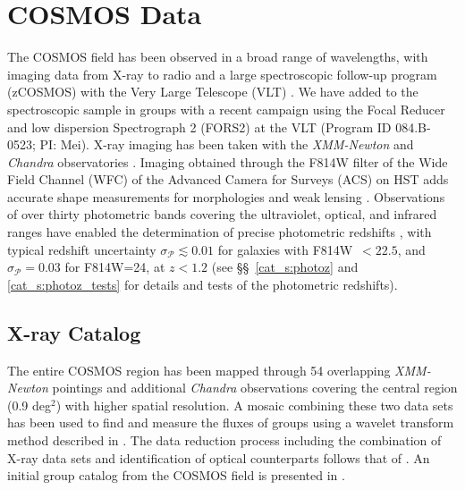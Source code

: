 
\section{COSMOS Data}
\label{cat_s:data}

The COSMOS field has been observed in a broad range of wavelengths,
with imaging data from X-ray to radio and a large spectroscopic
follow-up program (zCOSMOS) with the Very Large Telescope (VLT)
\citep{Scoville2007a,Koekemoer2007,Lilly2007}. We have added to the
spectroscopic sample in groups with a recent campaign using the
Focal Reducer and low dispersion Spectrograph 2 (FORS2) at the VLT
(Program ID 084.B-0523; PI: Mei). 
X-ray imaging has been taken with the {\sl XMM-Newton} \citep[1.5~Ms covering
2.13~deg$^2$;][]{Hasinger2007,Cappelluti2009} and {\sl Chandra} 
observatories \citep[1.8~Ms covering 0.9~deg$^2$;][]{Elvis2009}.  Imaging
obtained through the F814W filter of the Wide Field Channel (WFC) of
the Advanced Camera for Surveys (ACS) on HST adds accurate shape measurements for
morphologies and weak lensing \citep{Scarlata2007,Leauthaud2007}.
Observations of over thirty photometric bands covering the ultraviolet,
optical, and infrared ranges have enabled the determination 
of precise photometric redshifts \citep{Capak2007b,Ilbert2009}, with
typical redshift uncertainty $\sigma_{\mathcal{P}}\lesssim0.01$ for galaxies
with F814W~$<22.5$, and $\sigma_{\mathcal{P}}=0.03$ for F814W=24, at
$z<1.2$ (see \S\S~\ref{cat_s:photoz} and \ref{cat_s:photoz_tests} for details
and tests of the photometric redshifts).

\subsection{X-ray Catalog}
\label{cat_s:xray}

The entire COSMOS region has been mapped through 54 overlapping {\sl
  XMM-Newton} pointings and additional {\sl Chandra} observations
covering the central region (0.9 deg$^2$) with higher spatial
resolution. A mosaic combining these two data sets has been used to
find and measure the fluxes of groups using a wavelet transform method
described in \citet{Vikhlinin1998}. The data reduction process
including the combination of X-ray data sets and identification of
optical counterparts follows that of \citet{Finoguenov2009,
  Finoguenov2010}. An initial group catalog from the COSMOS field is
presented in \citet{Finoguenov2007}.

